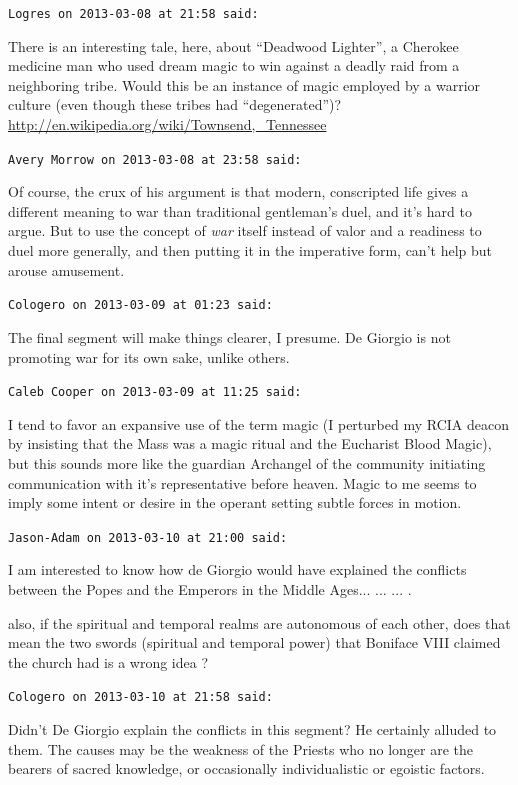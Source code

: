 \begin{footnotesize}
\begin{sffamily}
\texttt{Logres on 2013-03-08 at 21:58 said:}

There is an interesting tale, here, about ``Deadwood Lighter'', a Cherokee medicine man who used dream magic to win against a deadly raid from a neighboring tribe. Would this be an instance of magic employed by a warrior culture (even though these tribes had ``degenerated'')?\\
\url{http://en.wikipedia.org/wiki/Townsend,_Tennessee}


\hfill

\texttt{Avery Morrow on 2013-03-08 at 23:58 said:}

Of course, the crux of his argument is that modern, conscripted life gives a different meaning to war than traditional gentleman's duel, and it's hard to argue. But to use the concept of \emph{war} itself instead of valor and a readiness to duel more generally, and then putting it in the imperative form, can't help but arouse amusement.

\hfill

\texttt{Cologero on 2013-03-09 at 01:23 said:}

The final segment will make things clearer, I presume. De Giorgio is not promoting war for its own sake, unlike others.

\hfill

\texttt{Caleb Cooper on 2013-03-09 at 11:25 said:}

I tend to favor an expansive use of the term magic (I perturbed my RCIA deacon by insisting that the Mass was a magic ritual and the Eucharist Blood Magic), but this sounds more like the guardian Archangel of the community initiating communication with it's representative before heaven. Magic to me seems to imply some intent or desire in the operant setting subtle forces in motion.

\hfill

\texttt{Jason-Adam on 2013-03-10 at 21:00 said:}

I am interested to know how de Giorgio would have explained the conflicts between the Popes and the Emperors in the Middle Ages... ... ... .

also, if the spiritual and temporal realms are autonomous of each other, does that mean the two swords (spiritual and temporal power) that Boniface VIII claimed the church had is a wrong idea ?

\hfill

\texttt{Cologero on 2013-03-10 at 21:58 said:}

Didn't De Giorgio explain the conflicts in this segment? He certainly alluded to them. The causes may be the weakness of the Priests who no longer are the bearers of sacred knowledge, or occasionally individualistic or egoistic factors.


\end{sffamily}
\end{footnotesize}
